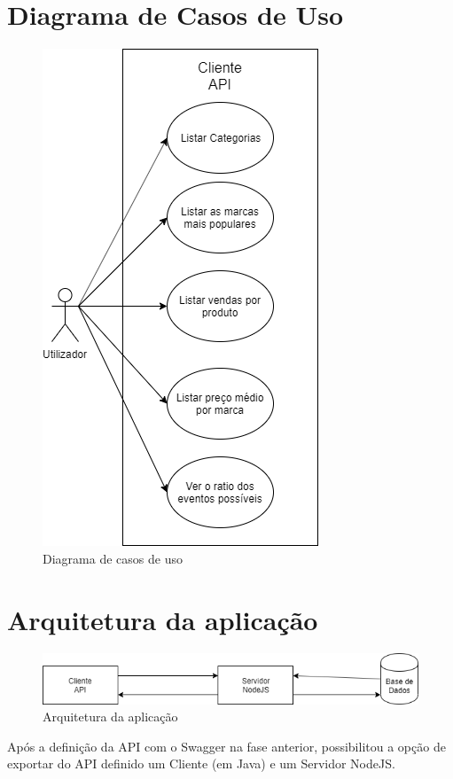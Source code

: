 \documentclass[runningheads]{llncs}
\begin{document}
\section{Diagrama de Casos de Uso}
\begin{figure}[H]
  \centering
  \includegraphics[scale=0.5]{Use_Cases.png}
  \caption{Diagrama de casos de uso}
\end{figure}

\section{Arquitetura da aplicação}
\begin{figure}[H]
  \centering
  \includegraphics[scale=0.6]{App_arc.png}
  \caption{Arquitetura da aplicação}
\end{figure}

Após a definição da API com o Swagger na fase anterior, possibilitou a opção de exportar do API definido um Cliente (em Java) e um Servidor NodeJS.
\end{document}
